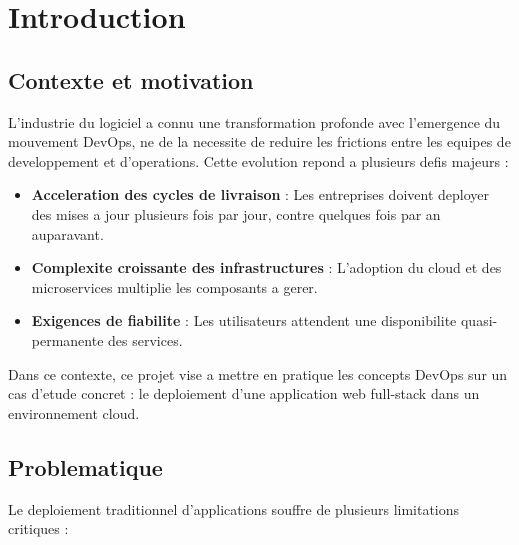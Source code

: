 \documentclass[12pt,a4paper,french]{report}
\begin{document}
\tableofcontents
\listoffigures
\listoftables
\newpage

\chapter{Introduction}

\section{Contexte et motivation}

L'industrie du logiciel a connu une transformation profonde avec l'emergence du mouvement DevOps, ne de la necessite de reduire les frictions entre les equipes de developpement et d'operations. Cette evolution repond a plusieurs defis majeurs :

\begin{itemize}
    \item \textbf{Acceleration des cycles de livraison} : Les entreprises doivent deployer des mises a jour plusieurs fois par jour, contre quelques fois par an auparavant.
    \item \textbf{Complexite croissante des infrastructures} : L'adoption du cloud et des microservices multiplie les composants a gerer.
    \item \textbf{Exigences de fiabilite} : Les utilisateurs attendent une disponibilite quasi-permanente des services.
\end{itemize}

Dans ce contexte, ce projet vise a mettre en pratique les concepts DevOps sur un cas d'etude concret : le deploiement d'une application web full-stack dans un environnement cloud.

\section{Problematique}

Le deploiement traditionnel d'applications souffre de plusieurs limitations critiques :
\end{document}
